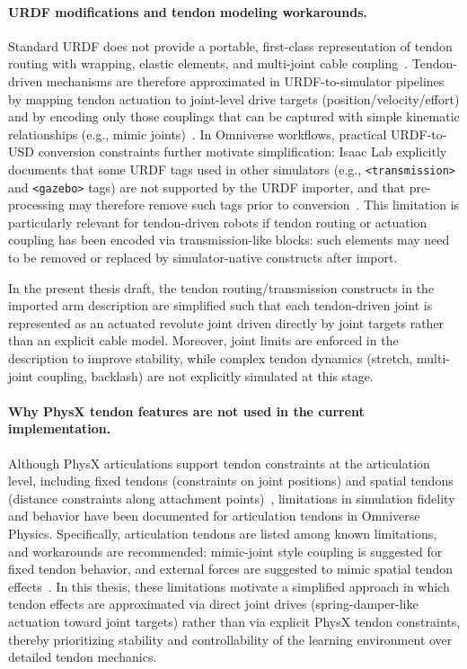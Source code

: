 \paragraph{URDF modifications and tendon modeling workarounds.}
Standard \ac{URDF} does not provide a portable, first-class representation of tendon routing with wrapping, elastic elements, and multi-joint cable coupling~\cite{ros2_control_joint_kinematics}. Tendon-driven mechanisms are therefore approximated in \ac{URDF}-to-simulator pipelines by mapping tendon actuation to joint-level drive targets (position/velocity/effort) and by encoding only those couplings that can be captured with simple kinematic relationships (e.g., mimic joints)~\cite{ros2_control_joint_kinematics}. In Omniverse workflows, practical \ac{URDF}-to-\ac{USD} conversion constraints further motivate simplification: Isaac Lab explicitly documents that some \ac{URDF} tags used in other simulators (e.g., \texttt{<transmission>} and \texttt{<gazebo>} tags) are not supported by the \ac{URDF} importer, and that pre-processing may therefore remove such tags prior to conversion~\cite{isaaclab_import_new_asset}. This limitation is particularly relevant for tendon-driven robots if tendon routing or actuation coupling has been encoded via transmission-like blocks: such elements may need to be removed or replaced by simulator-native constructs after import.

In the present thesis draft, the tendon routing/transmission constructs in the imported arm description are simplified such that each tendon-driven joint is represented as an actuated revolute joint driven directly by joint targets rather than an explicit cable model. Moreover, joint limits are enforced in the description to improve stability, while complex tendon dynamics (stretch, multi-joint coupling, backlash) are not explicitly simulated at this stage. %

\paragraph{Why PhysX tendon features are not used in the current implementation.}
Although PhysX articulations support tendon constraints at the articulation level, including fixed tendons (constraints on joint positions) and spatial tendons (distance constraints along attachment points)~\cite{physx_articulations_550}, limitations in simulation fidelity and behavior have been documented for articulation tendons in Omniverse Physics. Specifically, articulation tendons are listed among known limitations, and workarounds are recommended: mimic-joint style coupling is suggested for fixed tendon behavior, and external forces are suggested to mimic spatial tendon effects~\cite{omni_physics_current_limitations}. In this thesis, these limitations motivate a simplified approach in which tendon effects are approximated via direct joint drives (spring-damper-like actuation toward joint targets) rather than via explicit PhysX tendon constraints, thereby prioritizing stability and controllability of the learning environment over detailed tendon mechanics. %

